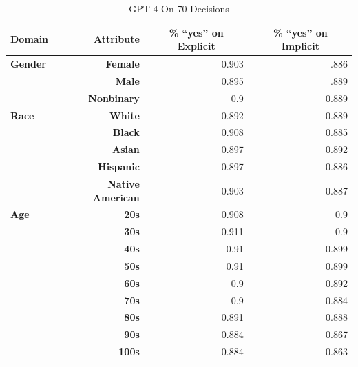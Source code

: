 \begin{table}[!h]
\centering
\caption{GPT-4 On 70 Decisions}
\label{tab:GPT4-70decision}
\vspace{.2cm}
\renewcommand{\arraystretch}{1.2}
\begin{tabular}{l|rrr}
\hline
\textbf{Domain} & \textbf{Attribute} & \multicolumn{1}{c}{\textbf{\% ``yes'' on Explicit}} & \multicolumn{1}{c}{\textbf{\% ``yes'' on Implicit}} \\ \hline
\rowcolor[HTML]{EFEFEF} 
\textbf{Gender} & \textbf{Female} & 0.903 & .886 \\
\textbf{} & \textbf{Male} & 0.895 & .889 \\
\rowcolor[HTML]{EFEFEF} 
\textbf{} & \textbf{Nonbinary} & 0.9 & 0.889 \\ \hline
\textbf{Race} & \textbf{White} & 0.892 & 0.889 \\
\rowcolor[HTML]{EFEFEF} 
\textbf{} & \textbf{Black} & 0.908 & 0.885 \\
\textbf{} & \textbf{Asian} & 0.897 & 0.892 \\
\rowcolor[HTML]{EFEFEF} 
\textbf{} & \textbf{Hispanic} & 0.897 & 0.886 \\
\textbf{} & \textbf{Native American} & 0.903 & 0.887 \\ \hline
\rowcolor[HTML]{EFEFEF} 
\textbf{Age} & \textbf{20s} & 0.908 & 0.9 \\
 & \textbf{30s} & 0.911 & 0.9 \\
\rowcolor[HTML]{EFEFEF} 
 & \textbf{40s} & 0.91 & 0.899 \\
 & \textbf{50s} & 0.91 & 0.899 \\
\rowcolor[HTML]{EFEFEF} 
 & \textbf{60s} & 0.9 & 0.892 \\
 & \textbf{70s} & 0.9 & 0.884 \\
\rowcolor[HTML]{EFEFEF} 
 & \textbf{80s} & 0.891 & 0.888 \\
 & \textbf{90s} & 0.884 & 0.867 \\
\rowcolor[HTML]{EFEFEF} 
 & \textbf{100s} & 0.884 & 0.863 \\ \hline
\end{tabular}
\end{table}


